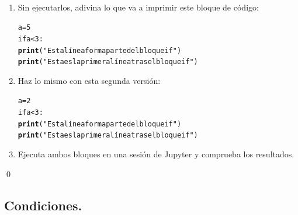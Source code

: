\documentclass[10pt,a4paper]{article}\usepackage[]{graphicx}\usepackage[]{color}
\makeatletter
\newcommand{\hlstr}[1]{\textcolor[rgb]{0.192,0.494,0.8}{#1}}%
\newcommand{\hlkwd}[1]{\textcolor[rgb]{0.737,0.353,0.396}{\textbf{#1}}}%
\newenvironment{kframe}{%
 \def\at@end@of@kframe{}%
 \ifinner\ifhmode%
  \def\at@end@of@kframe{\end{minipage}}%
  \begin{minipage}{\columnwidth}%
 \fi\fi%
 \def\FrameCommand##1{\hskip\@totalleftmargin \hskip-\fboxsep
 \colorbox{shadecolor}{##1}\hskip-\fboxsep
     \hskip-\linewidth \hskip-\@totalleftmargin \hskip\columnwidth}%
 \MakeFramed {\advance\hsize-\width
   \@totalleftmargin\z@ \linewidth\hsize
   \@setminipage}}%
 {\par\unskip\endMakeFramed%
 \at@end@of@kframe}
\newenvironment{knitrout}{}{} %
\makeatother
\begin{document}
\begin{ejercicio}
\label{tut02:ejercicio29}
\quad\\
\begin{enumerate}
\item Sin ejecutarlos, adivina lo que va a imprimir este bloque de código:
\begin{knitrout}
\color{fgcolor}\begin{kframe}
\begin{alltt}
a = 5
if a < 3:
     \hlkwd{print}(\hlstr{"Esta línea forma parte del bloque if"})
\hlkwd{print}(\hlstr{"Esta es la primera línea tras el bloque if"})
\end{alltt}
\end{kframe}
\end{knitrout}
\item Haz lo mismo con esta segunda versión:
\begin{knitrout}
\color{fgcolor}\begin{kframe}
\begin{alltt}
a = 2
if a < 3:
     \hlkwd{print}(\hlstr{"Esta línea forma parte del bloque if"})
\hlkwd{print}(\hlstr{"Esta es la primera línea tras el bloque if"})
\end{alltt}
\end{kframe}
\end{knitrout}
\item Ejecuta ambos bloques en una sesión de Jupyter y comprueba los resultados.
\end{enumerate}
\qed
\end{ejercicio}

\subsection{Condiciones.}
\label{tut02:subsec:Condiciones}
\end{document}
